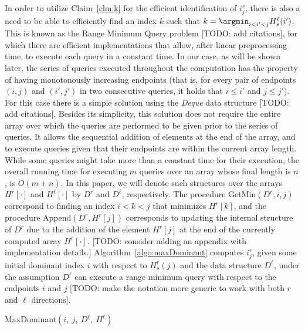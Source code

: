In order to utilize Claim~\ref{clm:k} for the efficient identification of $i^r_j$, there is also a need to be able to efficiently find an index $k$ such that $k = \argmin_{i < i' < j} H^\ell_s(i')$. This is known as the Range Minimum Query problem [TODO: add citations], for which there are efficient implementations that allow, after linear preprocessing time, to execute each query in a constant time. In our case, as will be shown later, the series of queries executed throughout the computation has the property of having monotonously increasing endpoints (that is, for every pair of endpoints $(i, j)$ and $(i', j')$ in two consecutive queries, it holds that $i \leq i'$ and $j \leq j'$). For this case there is a simple solution using the \emph{Deque} data structure [TODO: add citations]. Besides its simplicity, this solution does not require the entire array over which the queries are performed to be given prior to the series of queries. It allows the sequential addition of elements at the end of the array, and to execute queries given that their endpoints are within the current array length. While some queries might take more than a constant time for their execution, the overall running time for executing $m$ queries over an array whose final length is $n$, is $O(m+n)$. In this paper, we will denote such structures over the arrays $H^r[\cdot]$ and $H^\ell[\cdot]$  by $D^r$ and $D^\ell$, respectively. The procedure GetMin$(D^r, i, j)$ correspond to finding an index $i < k < j$ that minimizes $H^r[k]$, and the procedure Append$(D^r, H^r[j])$ corresponds to updating the internal structure of $D^r$ due to the addition of the element $H^r[j]$ at the end of the currently computed array $H^r[\cdot]$. [TODO: consider adding an appendix with implementation details.] Algorithm~\ref{algo:maxDominant} computes $i^r_j$, given some initial dominant index $i$ with respect to $H^r_s(j)$ and the data structure $D^\ell$, under the assumption $D^\ell$ can execute a range minimum query with respect to the endpoints $i$ and $j$ [TODO: make the notation more generic to work with both $r$ and $\ell$ directions].

\begin{algorithm}
	\;
	\caption{MaxDominant$(i, \ j, \ D^\ell, \ H^\ell)$}
	\label{algo:maxDominant}
\end{algorithm}


